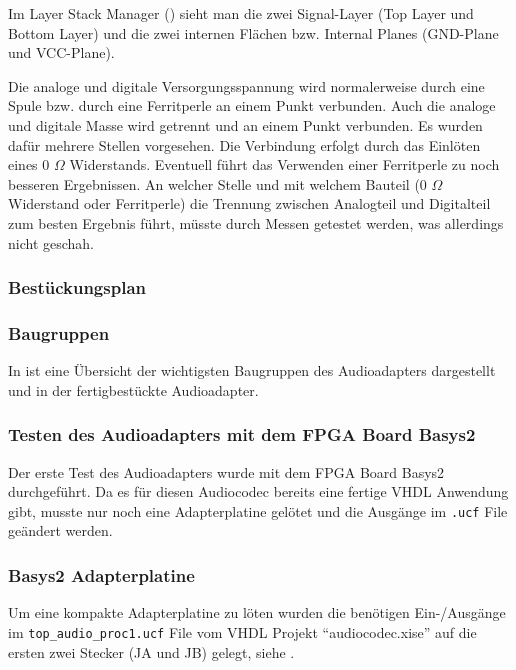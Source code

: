 Im Layer Stack Manager () sieht man die zwei Signal-Layer (Top Layer und Bottom Layer) und die zwei internen Flächen bzw. Internal Planes (GND-Plane und VCC-Plane).

Die analoge und digitale Versorgungsspannung wird normalerweise durch eine Spule bzw. durch eine Ferritperle an einem Punkt verbunden. Auch die analoge und digitale Masse wird getrennt und an einem Punkt verbunden. Es wurden dafür mehrere Stellen vorgesehen. Die Verbindung erfolgt durch das Einlöten eines 0 $\Omega$ Widerstands. Eventuell führt das Verwenden einer Ferritperle zu noch besseren Ergebnissen. An welcher Stelle und mit welchem Bauteil (0 $\Omega$ Widerstand oder Ferritperle) die Trennung zwischen Analogteil und Digitalteil zum besten Ergebnis führt, müsste durch Messen getestet werden, was allerdings nicht geschah.

\subsubsection{Bestückungsplan}

\subsubsection{Baugruppen}
In  ist eine Übersicht der wichtigsten Baugruppen des Audioadapters dargestellt und in  der fertigbestückte Audioadapter.


\subsubsection{Testen des Audioadapters mit dem FPGA Board Basys2}
Der erste Test des Audioadapters wurde mit dem FPGA Board Basys2 durchgeführt. Da es für diesen Audiocodec bereits eine fertige VHDL Anwendung gibt, musste nur noch eine Adapterplatine gelötet und die Ausgänge im \texttt{.ucf} File geändert werden.

\subsubsection{Basys2 Adapterplatine}
Um eine kompakte Adapterplatine zu löten wurden die benötigen Ein-/Ausgänge im \texttt{top\_audio\_proc1.ucf} File vom VHDL Projekt \enquote{audiocodec.xise} auf die ersten zwei Stecker (JA und JB) gelegt, siehe .

